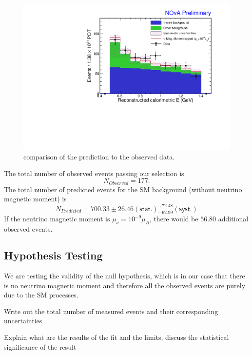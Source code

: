 \begin{figure}[hbtp]
\centering
\includegraphics[width=\textwidth]{Plots/NuMM/Stacked.pdf}
\caption[Final prediction and data comparison]{comparison of the prediction to the observed data.}
\label{fig:NuMMResults}
\end{figure}

The total number of observed events passing our selection is
\begin{equation}
N_{Observed} = 177.
\end{equation}
The total number of predicted events for the \gls{SM} background (without neutrino magnetic moment) is
\begin{equation}
N_{Predicted}=700.33 \pm 26.46\left(\textsf{stat.}\right) ^{+72.48}_{-62.99}\left(\textsf{syst.}\right)
\end{equation}
If the neutrino magnetic moment is $\mu_{\nu}=10^{-9}\mu_B$, there would be $56.80$ additional observed events.

\subsection{Hypothesis Testing}
We are testing the validity of the null hypothesis, which is in our case that there is no neutrino magnetic moment and therefore all the observed events are purely due to the \gls{SM} processes.


Write out the total number of measured events and their corresponding uncertainties

Explain what are the results of the fit and the limits, discuss the statistical significance of the result

